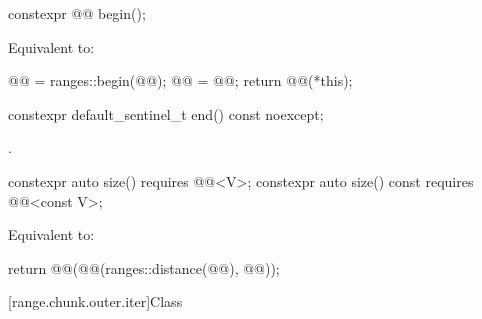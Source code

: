 \begin{itemdecl}
constexpr @@ begin();
\end{itemdecl}

\begin{itemdescr}
\pnum
\effects
Equivalent to:
\begin{codeblock}
@@ = ranges::begin(@@);
@@ = @@;
return @@(*this);
\end{codeblock}
\end{itemdescr}

\begin{itemdecl}
constexpr default_sentinel_t end() const noexcept;
\end{itemdecl}

\begin{itemdescr}
\pnum
\returns
{}.
\end{itemdescr}

\begin{itemdecl}
constexpr auto size() requires @@<V>;
constexpr auto size() const requires @@<const V>;
\end{itemdecl}

\begin{itemdescr}
\pnum
\effects
Equivalent to:
\begin{codeblock}
return @@(@@(ranges::distance(@@), @@));
\end{codeblock}
\end{itemdescr}

[range.chunk.outer.iter]{Class }

